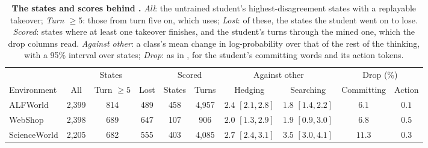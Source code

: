 \begin{table}[t]
\centering
\caption{\textbf{The states and scores behind .} \emph{All}: the untrained student's highest-disagreement states with a replayable takeover; \emph{Turn $\geq 5$}: those from turn five on, which  uses; \emph{Lost}: of these, the states the student went on to lose. \emph{Scored}: states where at least one takeover finishes, and the student's turns through the mined one, which the drop columns read. \emph{Against other}: a class's mean change in log-probability over that of the rest of the thinking, with a 95\% interval over states; \emph{Drop}: as in , for the student's committing words and its action tokens.}
\label{tab:drift-detail}
\footnotesize
\setlength{\tabcolsep}{3.5pt}
\begin{tabular}{@{}lccccccccc@{}}
\toprule
& \multicolumn{3}{c}{States} & \multicolumn{2}{c}{Scored} & \multicolumn{2}{c}{Against other} & \multicolumn{2}{c}{Drop (\%)} \\
\cmidrule(lr){2-4}\cmidrule(lr){5-6}\cmidrule(lr){7-8}\cmidrule(l){9-10}
Environment & All & Turn $\geq 5$ & Lost & States & Turns & Hedging & Searching & Committing & Action \\
\midrule\midrule
ALFWorld & 2,399 & 814 & 489 & 458 & 4,957 & $2.4$ $[2.1, 2.8]$ & $1.8$ $[1.4, 2.2]$ & $6.1$ & $0.1$ \\
WebShop & 2,398 & 689 & 647 & 107 & 906 & $2.0$ $[1.3, 2.9]$ & $1.9$ $[0.9, 3.0]$ & $6.8$ & $0.5$ \\
ScienceWorld & 2,205 & 682 & 555 & 403 & 4,085 & $2.7$ $[2.4, 3.1]$ & $3.5$ $[3.0, 4.1]$ & $11.3$ & $0.3$ \\
\bottomrule
\end{tabular}
\end{table}
